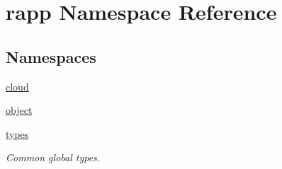 \hypertarget{namespacerapp}{\section{rapp Namespace Reference}
\label{namespacerapp}
}
\subsection*{Namespaces}
\begin{DoxyCompactItemize}
\item 
\hyperlink{namespacerapp_1_1cloud}{cloud}
\item 
\hyperlink{namespacerapp_1_1object}{object}
\item 
\hyperlink{namespacerapp_1_1types}{types}
\begin{DoxyCompactList}\small\item\em Common global types. \end{DoxyCompactList}\end{DoxyCompactItemize}

